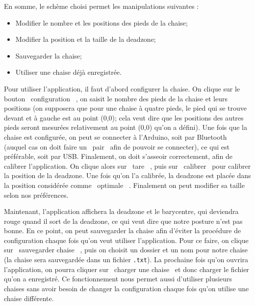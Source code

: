 \documentclass{polytech/polytech}
\begin{document}
En somme, le schème choisi permet les manipulations suivantes :
\begin{itemize}
\item Modifier le nombre et les positions des pieds de la chaise;
\item Modifier la position et la taille de la deadzone;
\item Sauvegarder la chaise;
\item Utiliser une chaise déjà enregistrée.
\end{itemize}


Pour utiliser l'application, il faut d'abord configurer la chaise. On clique sur le bouton \guillemotleft\ configuration \guillemotright\ , on saisit le nombre des pieds de la chaise et leurs positions (on supposera que pour une chaise à quatre pieds, le pied qui se trouve devant et à gauche est au point (0,0); cela veut dire que les positions des autres pieds seront mesurées relativement au point (0,0) qu'on a défini). Une fois que la chaise est configurée, on peut se connecter à l'Arduino, soit par Bluetooth (auquel cas on doit faire un \guillemotleft\ pair \guillemotright\  afin de pouvoir se connecter), ce qui est préférable, soit par USB. Finalement, on doit s'asseoir correctement, afin de calibrer l'application. On clique alors sur \guillemotleft\ tare \guillemotright\ , puis sur \guillemotleft\ calibrer \guillemotright\  pour calibrer la position de la deadzone. Une fois qu'on l'a calibrée, la deadzone est placée dans la position considérée comme \guillemotleft\ optimale \guillemotright\ . Finalement on peut modifier sa taille selon nos préférences. 

Maintenant, l'application affichera la deadzone et le barycentre, qui deviendra rouge quand il sort de la deadzone, ce qui veut dire que notre posture n'est pas bonne. En ce point, on peut sauvegarder la chaise afin d'éviter la procédure de configuration chaque fois qu'on veut utiliser l'application. Pour ce faire, on clique sur \guillemotleft\ sauvegarder chaise \guillemotright\ , puis on choisit un dossier et un nom pour notre chaise (la chaise sera sauvegardée dans un fichier \texttt{.txt}). La prochaine fois qu'on ouvrira l'application, on pourra cliquer sur \guillemotleft\ charger une chaise \guillemotright\  et donc charger le fichier qu'on a enregistré. Ce fonctionnement nous permet aussi d'utiliser plusieurs chaises sans avoir besoin de changer la configuration chaque fois qu'on utilise une chaise différente.


\end{document}
